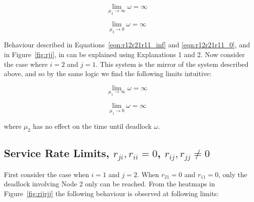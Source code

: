 \documentclass{article}
\begin{document}
\begin{equation}\label{eqn:r12r21r11_inf}
\lim_{\mu_2 \to \infty} \omega = \infty
\end{equation}

\begin{equation}\label{eqn:r12r21r11_0}
\lim_{\mu_2 \to 0} \omega = \infty
\end{equation}

Behaviour described in Equations~\ref{eqn:r12r21r11_inf} and \ref{eqn:r12r21r11_0}, and in Figure~\ref{fig:rjj}, in can be explained using Explanations 1 and 2.
Now consider the case where $i = 2$ and $j = 1$.
This system is the mirror of the system described above, and so by the same logic we find the following limits intuitive:

\begin{equation}\label{eqn:r12r21r22_inf}
\lim_{\mu_1 \to \infty} \omega = \infty
\end{equation}

\begin{equation}\label{eqn:r12r21r22_0}
\lim_{\mu_1 \to 0} \omega = \infty
\end{equation}

where $\mu_2$  has no effect on the time until deadlock $\omega$.


\subsection{Service Rate Limits, $r_{ji}, r_{ii} = 0$, $r_{ij}, r_{jj} \neq 0$}\label{sec:rijrjj}

First consider the case when $i = 1$ and $j = 2$.
When $r_{21} = 0$ and $r_{11} = 0$, only the deadlock involving Node 2 only can be reached. From the heatmaps in Figure~\ref{fig:rijrjj} the following behaviour is observed at following limits:
\end{document}
